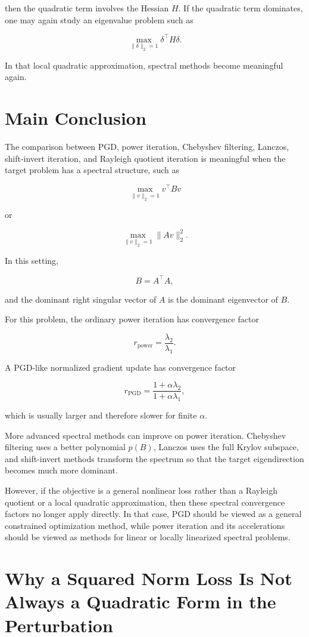 \documentclass{article}
\begin{document}
then the quadratic term involves the Hessian \(H\). If the quadratic term dominates, one may again study an eigenvalue problem such as

\[
\max_{\|\delta\|_2=1}\delta^\top H\delta.
\]

In that local quadratic approximation, spectral methods become meaningful again.

\section{Main Conclusion}

The comparison between PGD, power iteration, Chebyshev filtering, Lanczos, shift-invert iteration, and Rayleigh quotient iteration is meaningful when the target problem has a spectral structure, such as

\[
\max_{\|v\|_2=1}v^\top Bv
\]

or

\[
\max_{\|v\|_2=1}\|Av\|_2^2.
\]

In this setting,

\[
B=A^\top A,
\]

and the dominant right singular vector of \(A\) is the dominant eigenvector of \(B\).

For this problem, the ordinary power iteration has convergence factor

\[
r_{\mathrm{power}}
=
\frac{\lambda_2}{\lambda_1}.
\]

A PGD-like normalized gradient update has convergence factor

\[
r_{\mathrm{PGD}}
=
\frac{1+\alpha\lambda_2}{1+\alpha\lambda_1},
\]

which is usually larger and therefore slower for finite \(\alpha\).

More advanced spectral methods can improve on power iteration. Chebyshev filtering uses a better polynomial \(p(B)\), Lanczos uses the full Krylov subspace, and shift-invert methods transform the spectrum so that the target eigendirection becomes much more dominant.

However, if the objective is a general nonlinear loss rather than a Rayleigh quotient or a local quadratic approximation, then these spectral convergence factors no longer apply directly. In that case, PGD should be viewed as a general constrained optimization method, while power iteration and its accelerations should be viewed as methods for linear or locally linearized spectral problems.

\section{Why a Squared Norm Loss Is Not Always a Quadratic Form in the Perturbation}
\end{document}
